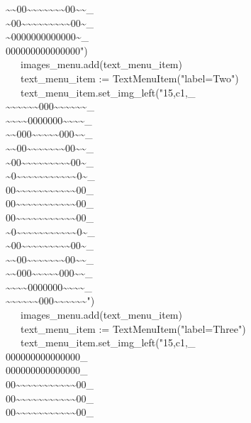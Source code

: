 {\~{}\~{}00\~{}\~{}\~{}\~{}\~{}\~{}\~{}00\~{}\~{}\_ \\
\~{}00\~{}\~{}\~{}\~{}\~{}\~{}\~{}\~{}\~{}00\~{}\_ \\
\~{}0000000000000\~{}\_ \\
000000000000000") \\
\>   \ \ \ images\_menu.add(text\_menu\_item) \\
\>   \ \ \ text\_menu\_item :=
TextMenuItem("label=Two") \\
\>   \ \ \ text\_menu\_item.set\_img\_left("15,c1,\_ \\
\~{}\~{}\~{}\~{}\~{}\~{}000\~{}\~{}\~{}\~{}\~{}\~{}\_ \\
\~{}\~{}\~{}\~{}0000000\~{}\~{}\~{}\~{}\_ \\
\~{}\~{}000\~{}\~{}\~{}\~{}\~{}000\~{}\~{}\_ \\
\~{}\~{}00\~{}\~{}\~{}\~{}\~{}\~{}\~{}00\~{}\~{}\_ \\
\~{}00\~{}\~{}\~{}\~{}\~{}\~{}\~{}\~{}\~{}00\~{}\_ \\
\~{}0\~{}\~{}\~{}\~{}\~{}\~{}\~{}\~{}\~{}\~{}\~{}0\~{}\_ \\
00\~{}\~{}\~{}\~{}\~{}\~{}\~{}\~{}\~{}\~{}\~{}00\_ \\
00\~{}\~{}\~{}\~{}\~{}\~{}\~{}\~{}\~{}\~{}\~{}00\_ \\
00\~{}\~{}\~{}\~{}\~{}\~{}\~{}\~{}\~{}\~{}\~{}00\_ \\
\~{}0\~{}\~{}\~{}\~{}\~{}\~{}\~{}\~{}\~{}\~{}\~{}0\~{}\_ \\
\~{}00\~{}\~{}\~{}\~{}\~{}\~{}\~{}\~{}\~{}00\~{}\_ \\
\~{}\~{}00\~{}\~{}\~{}\~{}\~{}\~{}\~{}00\~{}\~{}\_ \\
\~{}\~{}000\~{}\~{}\~{}\~{}\~{}000\~{}\~{}\_ \\
\~{}\~{}\~{}\~{}0000000\~{}\~{}\~{}\~{}\_ \\
\~{}\~{}\~{}\~{}\~{}\~{}000\~{}\~{}\~{}\~{}\~{}\~{}") \\
\>   \ \ \ images\_menu.add(text\_menu\_item) \\
\>   \ \ \ text\_menu\_item :=
TextMenuItem("label=Three") \\
\>   \ \ \ text\_menu\_item.set\_img\_left("15,c1,\_ \\
000000000000000\_ \\
000000000000000\_ \\
00\~{}\~{}\~{}\~{}\~{}\~{}\~{}\~{}\~{}\~{}\~{}00\_ \\
00\~{}\~{}\~{}\~{}\~{}\~{}\~{}\~{}\~{}\~{}\~{}00\_ \\
00\~{}\~{}\~{}\~{}\~{}\~{}\~{}\~{}\~{}\~{}\~{}00\_ \\
}
